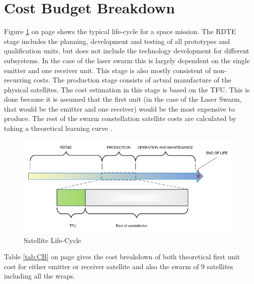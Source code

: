 \section{Cost Budget Breakdown}
\label{DDCB}
Figure \ref{fig:lifecycle} on page \pageref{fig:lifecycle} shows the typical life-cycle for a space mission. The \ac{RDTE} stage includes the planning, development and testing of all prototypes and qualification units, but does not include the technology development for different subsystems. In the case of the laser swarm this is largely dependent on the single emitter and one receiver unit. This stage is also mostly consistent of non-recurring costs. The production stage consists of actual manufacture of the physical satellites. The cost estimation in this stage is based on the \ac{TFU}. This is done because it is assumed that the first unit (in the case of the Laser Swarm, that would be the emitter and one receiver) would be the most expensive to produce. The rest of the swarm constellation satellite costs are calculated by taking a theoretical learning curve \cite{larson}. 

\begin{figure}[ht!]
\centering
\includegraphics[scale = 0.8]{chapters/img/lifetime.jpg}
\caption{Satellite Life-Cycle}
\label{fig:lifecycle}
\end{figure}

Table \ref{tab:CB} on page \pageref{tab:CB} gives the cost breakdown of both theoretical first unit cost for either emitter or receiver satellite and also the swarm of 9 satellites including all the wraps.

